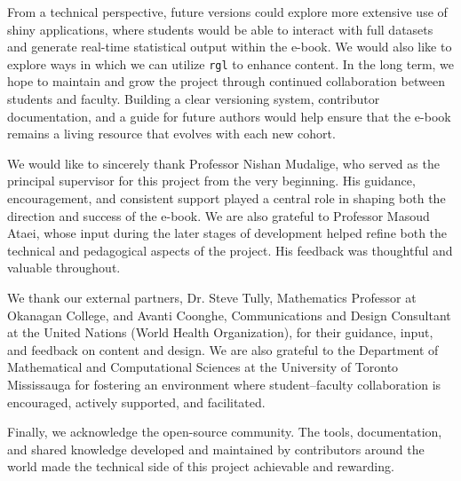 \documentclass[11pt]{article}
\begin{document}
From a technical perspective, future versions could explore more extensive use of shiny applications, where students would be able to interact with full datasets and generate real-time statistical output within the e-book. 
We would also like to explore ways in which we can utilize \texttt{rgl} to enhance content.
In the long term, we hope to maintain and grow the project through continued collaboration between students and faculty. Building a clear versioning system, contributor documentation, and a guide for future authors would help ensure that the e-book remains a living resource that evolves with each new cohort.


\begin{acknowledgments}
We would like to sincerely thank Professor Nishan Mudalige, who served as the principal supervisor for this project from the very beginning. His guidance, encouragement, and consistent support played a central role in shaping both the direction and success of the e-book.
We are also grateful to Professor Masoud Ataei, whose input during the later stages of development helped refine both the technical and pedagogical aspects of the project. His feedback was thoughtful and valuable throughout.

We thank our external partners, Dr. Steve Tully, Mathematics Professor at Okanagan College, and Avanti Coonghe, Communications and Design Consultant at the United Nations (World Health Organization), for their guidance, input, and feedback on content and design.
We are also grateful to the Department of Mathematical and Computational Sciences at the University of Toronto Mississauga for fostering an environment where student–faculty collaboration is encouraged, actively supported, and facilitated.

Finally, we acknowledge the open-source community. The tools, documentation, and shared knowledge developed and maintained by contributors around the world made the technical side of this project achievable and rewarding.
\end{acknowledgments}

\printbibliography[title={REFERENCES},heading=bibintoc]
\end{document}
